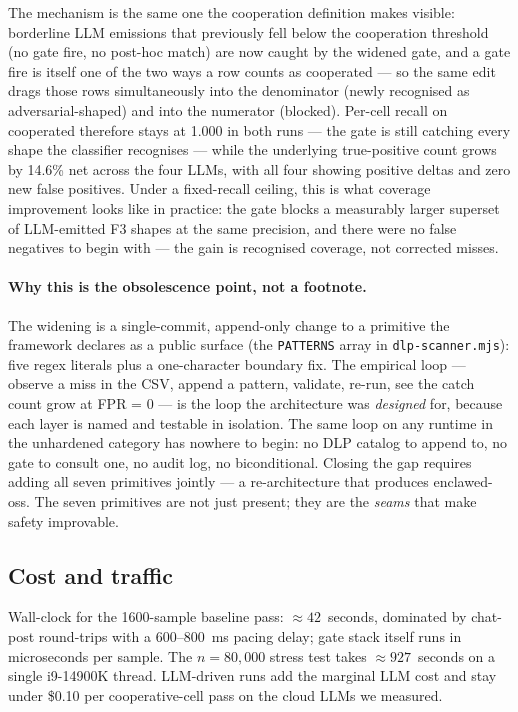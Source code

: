 \documentclass[11pt]{article}
\begin{document}
\noindent The mechanism is the same one the cooperation definition makes
visible: borderline LLM emissions that previously fell below the
cooperation threshold (no gate fire, no post-hoc match) are now caught by
the widened gate, and a gate fire is itself one of the two ways a row
counts as cooperated --- so the same edit drags those rows simultaneously
into the denominator (newly recognised as adversarial-shaped) and into
the numerator (blocked). Per-cell recall on cooperated therefore stays at
1.000 in both runs --- the gate is still catching every shape the
classifier recognises --- while the underlying true-positive count grows
by 14.6\% net across the four LLMs, with all four showing positive deltas
and zero new false positives. Under a fixed-recall ceiling, this is what
coverage improvement looks like in practice: the gate blocks a
measurably larger superset of LLM-emitted F3 shapes at the same
precision, and there were no false negatives to begin with --- the gain
is recognised coverage, not corrected misses.

\paragraph{Why this is the obsolescence point, not a footnote.} The
widening is a single-commit, append-only change to a primitive the
framework declares as a public surface (the \texttt{PATTERNS} array
in \texttt{dlp-scanner.mjs}): five regex literals plus a
one-character boundary fix. The empirical loop --- observe a miss
in the CSV, append a pattern, validate, re-run, see the catch count
grow at FPR = 0 --- is the loop the architecture was
\emph{designed} for, because each layer is named and testable in
isolation. The same loop on any runtime in the unhardened category
has nowhere to begin: no DLP catalog to append to, no gate to
consult one, no audit log, no biconditional. Closing the gap
requires adding all seven primitives jointly --- a re-architecture
that produces enclawed-oss. The seven primitives are not just
present; they are the \emph{seams} that make safety improvable.

\subsection{Cost and traffic}

Wall-clock for the 1600-sample baseline pass: $\approx 42$~seconds,
dominated by chat-post round-trips with a 600--800~ms pacing delay;
gate stack itself runs in microseconds per sample. The
$n=80{,}000$ stress test takes $\approx 927$~seconds on a single
i9-14900K thread. LLM-driven runs add the marginal LLM cost and stay
under \$0.10 per cooperative-cell pass on the cloud LLMs we measured.
\end{document}
